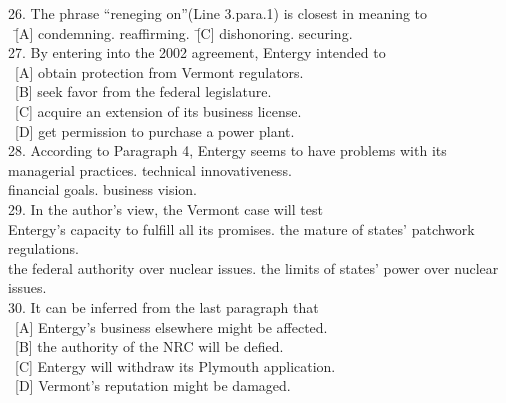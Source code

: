 \begin{tabbing}
26. The phrase “reneging on”(Line 3.para.1) is closest in meaning to\\
\ \= [A] condemning.  \quad\quad [B] reaffirming.\ \quad\quad\quad\quad\= [C] dishonoring. \quad\quad [D] securing.\\
27. By entering into the 2002 agreement, Entergy intended to\\
\ [A] obtain protection from Vermont regulators.\\ 
\ [B] seek favor from the federal legislature.\\
\ [C] acquire an extension of its business license.\\ 
\ [D] get permission to purchase a power plant.\\
28. According to Paragraph 4, Entergy seems to have problems with its\\
\> [A] managerial practices. \> [B] technical innovativeness.\\
\> [C] financial goals. \> [D] business vision.\\
29. In the author’s view, the Vermont case will test\\
\> [A] Entergy’s capacity to fulfill all its promises. \> [B] the mature of states’ patchwork regulations.\\
\> [C] the federal authority over nuclear issues. \> [D] the limits of states’ power over nuclear issues.\\
30. It can be inferred from the last paragraph that\\
\ [A] Entergy’s business elsewhere might be affected.\\ 
\ [B] the authority of the NRC will be defied.\\
\ [C] Entergy will withdraw its Plymouth application.\\ 
\ [D] Vermont’s reputation might be damaged. \\
\end{tabbing}
